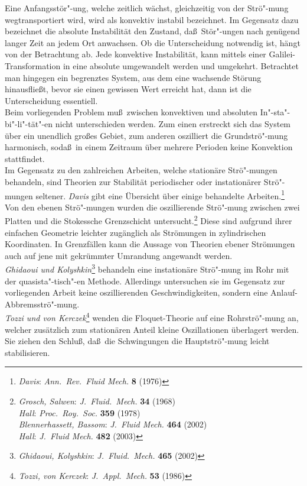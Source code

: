 \documentclass[10pt,a5paper,oneside,draft]{book}
\numberwithin{equation}{chapter}
\def\bibspace{\hspace*{18pt}}
\def\bibspace{\hspace*{21pt}}
\begin{document}
Eine Anfangsst\"or"-ung, welche zeitlich w\"achst, gleichzeitig von der Str\"o"-mung wegtransportiert wird, wird als konvektiv instabil bezeichnet.
Im Gegensatz dazu bezeichnet die absolute Instabilit\"at den Zustand, da\ss\ St\"or"-ungen nach gen\"ugend langer Zeit an jedem Ort anwachsen.
Ob die Unterscheidung notwendig ist, h\"angt von der Betrachtung ab.
Jede konvektive Instabilit\"at, kann mittels einer Galilei-\!Transformation in eine absolute umgewandelt werden und umgekehrt.
Betrachtet man hingegen ein begrenztes System, aus dem eine wachsende St\"orung hinausflie\ss t, bevor sie einen gewissen Wert erreicht hat, dann ist die Unterscheidung essentiell.\\
Beim vorliegenden Problem mu\ss\ zwischen konvektiven und absoluten In"-sta"-bi"-li"-t\"at"-en nicht unterschieden werden.
Zum einen erstreckt sich das System \"uber ein unendlich gro\ss es Gebiet, zum anderen oszilliert die Grundstr\"o"-mung harmonisch, soda\ss\ in einem Zeitraum \"uber mehrere Perioden keine Konvektion stattfindet.\\

Im Gegensatz zu den zahlreichen Arbeiten, welche station\"are Str\"o"-mungen behandeln, sind Theorien zur Stabilit\"at periodischer oder instation\"arer Str\"o"-mungen seltener.
\textsl{Davis} gibt eine \"Ubersicht \"uber einige behandelte Arbeiten.\footnote{\label{bib:davis_review}\textsl{Davis}: \textit{Ann.\ Rev.\ Fluid Mech.} \textbf{8} (1976)}\\
Von den ebenen Str\"o"-mungen wurden die oszillierende Str\"o"-mung zwischen zwei Platten und die Stokessche Grenzschicht untersucht.\footnote{\label{bib:grosch_salwen}\textsl{Grosch, Salwen}: \textit{J.\ Fluid.\ Mech.} \textbf{34} (1968)\\\bibspace\label{bib:hall}\textsl{Hall}: \textit{Proc.\ Roy.\ Soc.} \textbf{359} (1978)\\\bibspace\label{bib:blennerhassett_bassom}\textsl{Blennerhassett, Bassom}: \textit{J.\ Fluid Mech.} \textbf{464} (2002)\\\bibspace\label{bib:hall3}\textsl{Hall}: \textit{J.\ Fluid Mech.} \textbf{482} (2003)}
Diese sind aufgrund ihrer einfachen Geometrie leichter zug\"anglich als Str\"omungen in zylindrischen Koordinaten.
In Grenzf\"allen kann die Aussage von Theorien ebener Str\"omungen auch auf jene mit gekr\"ummter Umrandung angewandt werden.\\
\textsl{Ghidaoui und Kolyshkin}\footnote{\label{bib:ghidaoui_kolyshkin}\textsl{Ghidaoui, Kolyshkin}: \textit{J.\ Fluid.\ Mech.} \textbf{465} (2002)} behandeln eine instation\"are Str\"o"-mung im Rohr mit der quasista"-tisch"-en Methode. Allerdings untersuchen sie im Gegensatz zur vorliegenden Arbeit keine oszillierenden Geschwindigkeiten, sondern eine Anlauf-Abbremsstr\"o"-mung.\\
\textsl{Tozzi und von Kerczek}\footnote{\label{bib:tozzi_kerczek}\textsl{Tozzi, von Kerczek}: \textit{J.\ Appl.\ Mech.} \textbf{53} (1986)} wenden die Floquet-\!Theorie auf eine Rohrstr\"o"-mung an, welcher zus\"atzlich zum station\"aren Anteil kleine Oszillationen \"uberlagert werden.
Sie ziehen den Schlu\ss, da\ss\ die Schwingungen die Hauptstr\"o"-mung leicht stabilisieren.\\
\end{document}
